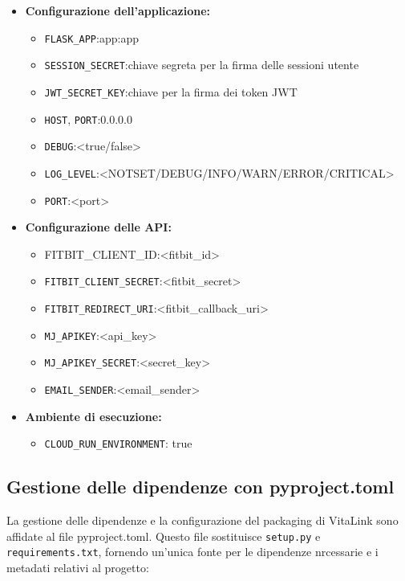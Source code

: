 \documentclass[12pt,a4paper,oneside]{report}
\begin{document}
\begin{itemize}
\begin{itemize}
              \item \textbf{Configurazione dell'applicazione:}
                    \begin{itemize}
                        \item \texttt{FLASK\_APP}:app:app
                        \item \texttt{SESSION\_SECRET}:chiave segreta per la firma delle sessioni utente
                        \item \texttt{JWT\_SECRET\_KEY}:chiave per la firma dei token JWT
                        \item \texttt{HOST}, \texttt{PORT}:0.0.0.0
                        \item \texttt{DEBUG}:<true/false>
                        \item \texttt{LOG\_LEVEL}:<NOTSET/DEBUG/INFO/WARN/ERROR/CRITICAL>
                        \item \texttt{PORT}:<port>
                    \end{itemize}
              \item \textbf{Configurazione delle API:}
                    \begin{itemize}
                        \item FITBIT\_CLIENT\_ID:<fitbit\_id>
                        \item \texttt{FITBIT\_CLIENT\_SECRET}:<fitbit\_secret>
                        \item \texttt{FITBIT\_REDIRECT\_URI}:<fitbit\_callback\_uri>
                        \item \texttt{MJ\_APIKEY}:<api\_key>
                        \item \texttt{MJ\_APIKEY\_SECRET}:<secret\_key>
                        \item \texttt{EMAIL\_SENDER}:<email\_sender>
                    \end{itemize}
              \item \textbf{Ambiente di esecuzione:}
                    \begin{itemize}
                        \item \texttt{CLOUD\_RUN\_ENVIRONMENT}: true
                    \end{itemize}
          \end{itemize}
\end{itemize}

\subsection{Gestione delle dipendenze con pyproject.toml}
La gestione delle dipendenze e la configurazione del packaging di VitaLink sono affidate al file pyproject.toml.
Questo file sostituisce \texttt{setup.py} e \texttt{requirements.txt}, fornendo un'unica fonte per le dipendenze nrcessarie e i metadati relativi al progetto:
\end{document}
